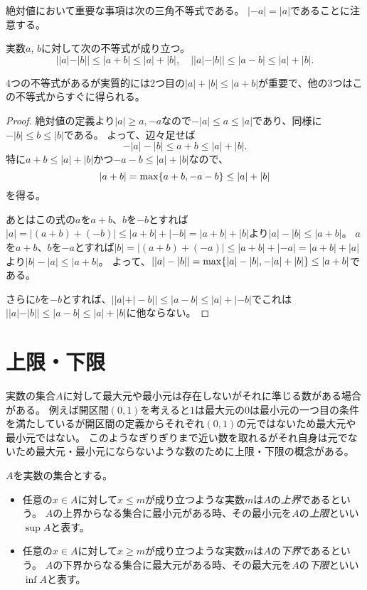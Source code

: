 絶対値において重要な事項は次の三角不等式である。
$|-a| = |a|$であることに注意する。

\begin{proposition}[三角不等式]
実数$a$, $b$に対して次の不等式が成り立つ。
$$
||a|-|b|| \le |a+b| \le |a|+|b|,
\quad ||a|-|b|| \le |a-b| \le |a|+|b|.
$$
\end{proposition}

4つの不等式があるが実質的には2つ目の$|a|+|b| \le |a+b|$が重要で、他の3つはこの不等式からすぐに得られる。

\begin{proof}
絶対値の定義より$|a| \ge a, -a$なので$-|a| \le a \le |a|$であり、同様に$-|b| \le b \le |b|$である。
よって、辺々足せば
$$
-|a|-|b| \le a+b \le |a|+|b|.
$$
特に$a+b \le |a|+|b|$かつ$-a-b \le |a|+|b|$なので、
$$
|a+b| = \max\{ a+b, -a-b \} \le |a|+|b|
$$
を得る。

あとはこの式の$a$を$a+b$、$b$を$-b$とすれば$|a| = |(a+b)+(-b)| \le |a+b|+|-b| = |a+b|+|b|$より$|a|-|b| \le |a+b|$。
$a$を$a+b$、$b$を$-a$とすれば$|b| = |(a+b)+(-a)| \le |a+b|+|-a| = |a+b|+|a|$より$|b|-|a| \le |a+b|$。
よって、$||a|-|b|| = \max\{ |a|-|b|, -|a|+|b| \} \le |a+b|$である。

さらに$b$を$-b$とすれば、$||a|+|-b|| \le |a-b| \le |a|+|-b|$でこれは$||a|-|b|| \le |a-b| \le |a|+|b|$に他ならない。
\end{proof}

\section{上限・下限}

実数の集合$A$に対して最大元や最小元は存在しないがそれに準じる数がある場合がある。
例えば開区間$(0, 1)$を考えると$1$は最大元の$0$は最小元の一つ目の条件を満たしているが開区間の定義からそれぞれ$(0, 1)$の元ではないため最大元や最小元ではない。
このようなぎりぎりまで近い数を取れるがそれ自身は元でないため最大元・最小元にならないような数のために上限・下限の概念がある。

\begin{definition}[集合の上限と下限]
$A$を実数の集合とする。
\begin{itemize}
\item
任意の$x \in A$に対して$x \le m$が成り立つような実数$m$は$A$の\emph{上界}であるという。
$A$の上界からなる集合に最小元がある時、その最小元を$A$の\emph{上限}といい$\sup A$と表す。
\item
任意の$x \in A$に対して$x \ge m$が成り立つような実数$m$は$A$の\emph{下界}であるという。
$A$の下界からなる集合に最大元がある時、その最大元を$A$の\emph{下限}といい$\inf A$と表す。
\end{itemize}
\end{definition}

